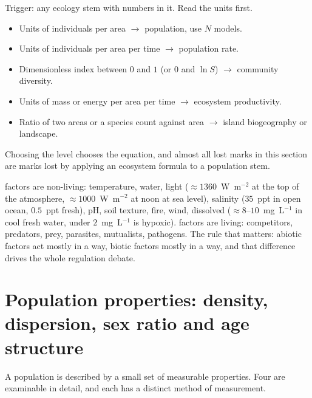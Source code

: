 \begin{tipbox}[title={TECHNIQUE: identify the level before doing any work}]
Trigger: any ecology stem with numbers in it. Read the units first.
\begin{itemize}
\item Units of individuals per area $\rightarrow$ population, use $N$ models.
\item Units of individuals per area per time $\rightarrow$ population rate.
\item Dimensionless index between $0$ and $1$ (or $0$ and $\ln S$)
$\rightarrow$ community diversity.
\item Units of mass or energy per area per time $\rightarrow$ ecosystem
productivity.
\item Ratio of two areas or a species count against area $\rightarrow$ island
biogeography or landscape.
\end{itemize}
Choosing the level chooses the equation, and almost all lost marks in this
section are marks lost by applying an ecosystem formula to a population stem.
\end{tipbox}

\begin{keybox}[title={MEMORIZE: the abiotic and biotic factor split}]
 factors are non-living: temperature, water, light
($\approx 1360$~W~m$^{-2}$ at the top of the atmosphere, $\approx 1000$~W~m$^{-2}$
at noon at sea level), salinity ($35$~ppt in open ocean, $0.5$~ppt fresh),
pH, soil texture, fire, wind, dissolved  ($\approx 8$--$10$~mg~L$^{-1}$
in cool fresh water, under $2$~mg~L$^{-1}$ is hypoxic).  factors are
living: competitors, predators, prey, parasites, mutualists, pathogens. The rule
that matters: abiotic factors act mostly in a  way, biotic
factors mostly in a  way, and that difference drives the
whole regulation debate.
\end{keybox}

\section{Population properties: density, dispersion, sex ratio and age structure}

A population is described by a small set of measurable properties. Four are
examinable in detail, and each has a distinct method of measurement.

